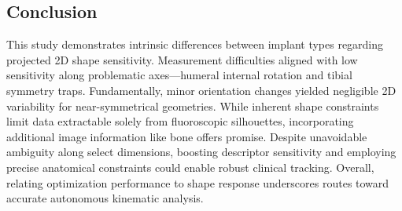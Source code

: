 \subsection{Conclusion}
This study demonstrates intrinsic differences between implant types regarding projected 2D shape sensitivity.
Measurement difficulties aligned with low sensitivity along problematic axes—humeral internal rotation and tibial symmetry traps.
Fundamentally, minor orientation changes yielded negligible 2D variability for near-symmetrical geometries.
While inherent shape constraints limit data extractable solely from fluoroscopic silhouettes, incorporating additional image information like bone offers promise.
Despite unavoidable ambiguity along select dimensions, boosting descriptor sensitivity and employing precise anatomical constraints could enable robust clinical tracking.
Overall, relating optimization performance to shape response underscores routes toward accurate autonomous kinematic analysis.

